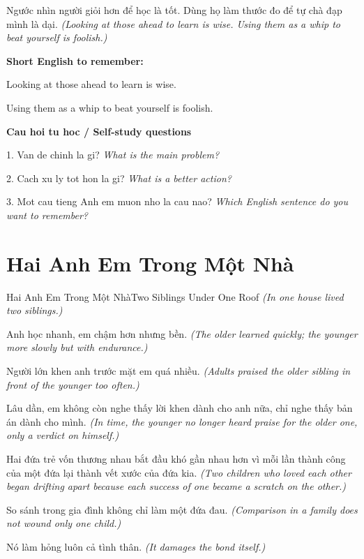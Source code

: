\begin{baihoc}
Ngước nhìn người giỏi hơn để học là tốt. Dùng họ làm thước đo để tự chà đạp mình là dại.
\textit{(Looking at those ahead to learn is wise. Using them as a whip to beat yourself is foolish.)}
\end{baihoc}

\begin{ghinhoanh}
\textbf{Short English to remember:}

Looking at those ahead to learn is wise.

Using them as a whip to beat yourself is foolish.

\end{ghinhoanh}

\begin{tuhocnhanh}
\textbf{Cau hoi tu hoc / Self-study questions}

1. Van de chinh la gi? \textit{What is the main problem?}

2. Cach xu ly tot hon la gi? \textit{What is a better action?}

3. Mot cau tieng Anh em muon nho la cau nao? \textit{Which English sentence do you want to remember?}
\end{tuhocnhanh}
\ngancach

\section{Hai Anh Em Trong Một Nhà}
\begin{truyen}{Hai Anh Em Trong Một Nhà}{Two Siblings Under One Roof}
\textit{(In one house lived two siblings.)}

Anh học nhanh, em chậm hơn nhưng bền.
\textit{(The older learned quickly; the younger more slowly but with endurance.)}

Người lớn khen anh trước mặt em quá nhiều.
\textit{(Adults praised the older sibling in front of the younger too often.)}

Lâu dần, em không còn nghe thấy lời khen dành cho anh nữa, chỉ nghe thấy bản án dành cho mình.
\textit{(In time, the younger no longer heard praise for the older one, only a verdict on himself.)}

Hai đứa trẻ vốn thương nhau bắt đầu khó gần nhau hơn vì mỗi lần thành công của một đứa lại thành vết xước của đứa kia.
\textit{(Two children who loved each other began drifting apart because each success of one became a scratch on the other.)}

So sánh trong gia đình không chỉ làm một đứa đau.
\textit{(Comparison in a family does not wound only one child.)}

Nó làm hỏng luôn cả tình thân.
\textit{(It damages the bond itself.)}

\end{truyen}

